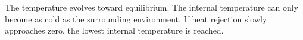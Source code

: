 The temperature evolves toward equilibrium.  
The internal temperature can only become as cold as the surrounding environment.  
If heat rejection slowly approaches zero, the lowest internal temperature is reached.